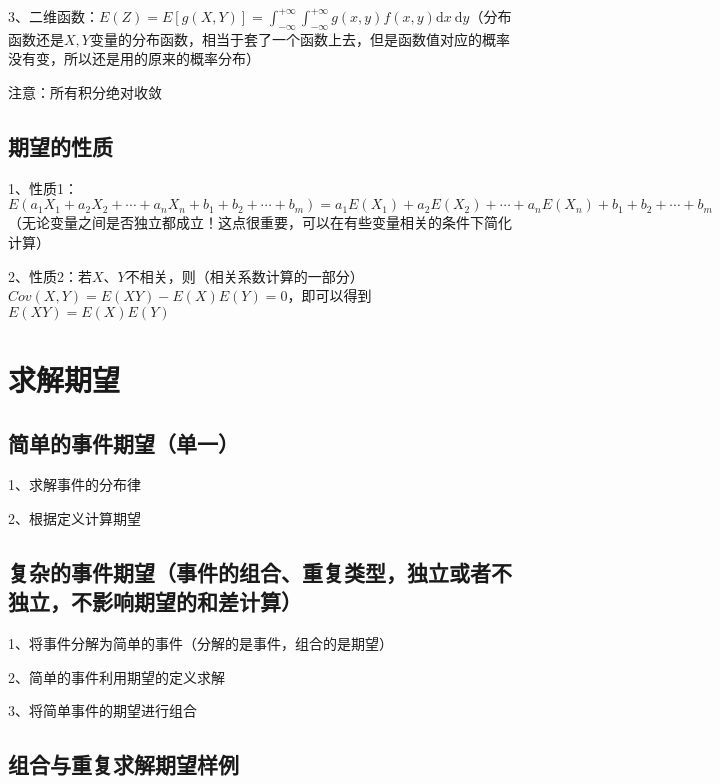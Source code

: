 3、二维函数：$E(Z)=E[g(X, Y)]=\int_{-\infty}^{+\infty} \int_{-\infty}^{+\infty} g(x, y) f(x, y) \mathrm{d} x \mathrm{~d} y$（分布函数还是$X,Y$变量的分布函数，相当于套了一个函数上去，但是函数值对应的概率没有变，所以还是用的原来的概率分布）

注意：所有积分绝对收敛



\subsection{期望的性质}

1、性质1：$E(a_1X_1+a_2X_2+\cdots+a_nX_n+b_1+b_2+\cdots+b_m)=a_1E(X_1)+a_2E(X_2)+\cdots+a_nE(X_n)+b_1+b_2+\cdots+b_m$（无论变量之间是否独立都成立！这点很重要，可以在有些变量相关的条件下简化计算）

2、性质2：若$X$、$Y$不相关，则（相关系数计算的一部分）$C o v ( X , Y ) = E ( X Y ) - E ( X ) E ( Y ) =0$，即可以得到$E ( X Y ) = E ( X ) E ( Y )$

\section{求解期望}



\subsection{简单的事件期望（单一）}

1、求解事件的分布律

2、根据定义计算期望



\subsection{复杂的事件期望（事件的组合、重复类型，独立或者不独立，不影响期望的和差计算）}

1、将事件分解为简单的事件（分解的是事件，组合的是期望）

2、简单的事件利用期望的定义求解

3、将简单事件的期望进行组合



\subsection{组合与重复求解期望样例}

